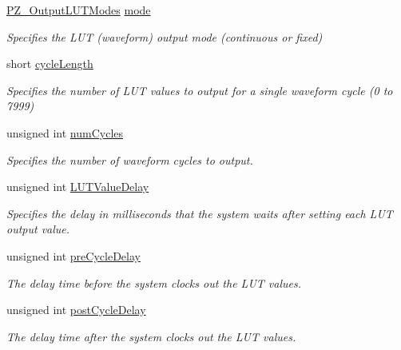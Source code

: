 \begin{DoxyCompactItemize}
\item 
\hyperlink{group___common_ga112996f7606729ecb26937393496d178}{P\+Z\+\_\+\+Output\+L\+U\+T\+Modes} \hyperlink{struct_p_z___l_u_t_wave_parameters_a7727bf94a2c4de7acd16d68eb8325cd3}{mode}
\begin{DoxyCompactList}\small\item\em Specifies the L\+UT (waveform) output mode (continuous or fixed) \end{DoxyCompactList}\item 
short \hyperlink{struct_p_z___l_u_t_wave_parameters_aa41888de73eb1ef3d80e1ef85118dc2e}{cycle\+Length}
\begin{DoxyCompactList}\small\item\em Specifies the number of L\+UT values to output for a single waveform cycle (0 to 7999) \end{DoxyCompactList}\item 
unsigned int \hyperlink{struct_p_z___l_u_t_wave_parameters_af0473f741904642e45bb31c47729ae07}{num\+Cycles}
\begin{DoxyCompactList}\small\item\em Specifies the number of waveform cycles to output. \end{DoxyCompactList}\item 
unsigned int \hyperlink{struct_p_z___l_u_t_wave_parameters_aaccf1dba9b7ef35ae9af9305d032500e}{L\+U\+T\+Value\+Delay}
\begin{DoxyCompactList}\small\item\em Specifies the delay in milliseconds that the system waits after setting each L\+UT output value. \end{DoxyCompactList}\item 
unsigned int \hyperlink{struct_p_z___l_u_t_wave_parameters_a6bf977c7d80c340340d40a4194965dd8}{pre\+Cycle\+Delay}
\begin{DoxyCompactList}\small\item\em The delay time before the system clocks out the L\+UT values. \end{DoxyCompactList}\item 
unsigned int \hyperlink{struct_p_z___l_u_t_wave_parameters_aa99ac284feb8f7b64d14ad326877519f}{post\+Cycle\+Delay}
\begin{DoxyCompactList}\small\item\em The delay time after the system clocks out the L\+UT values. \end{DoxyCompactList}\item 

\end{DoxyCompactItemize}
